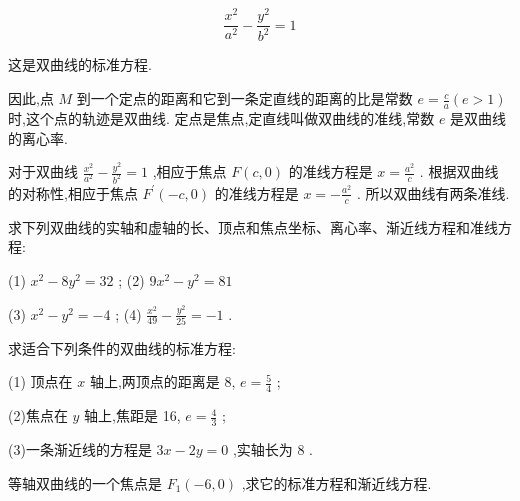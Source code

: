 \documentclass[lang=cn,newtx,10pt,scheme=chinese]{elegantbook}
\begin{document}
\[
  \frac{{x}^{2}}{{a}^{2}} - \frac{{y}^{2}}{{b}^{2}} = 1
\]

这是双曲线的标准方程.

因此,点 \(M\) 到一个定点的距离和它到一条定直线的距离的比是常数 \(e = \frac{c}{a}\left( {e > 1}\right)\) 时,这个点的轨迹是双曲线. 定点是焦点,定直线叫做双曲线的准线,常数 \(e\) 是双曲线的离心率.

对于双曲线 \(\frac{{x}^{2}}{{a}^{2}} - \frac{{y}^{2}}{{b}^{2}} = 1\) ,相应于焦点 \(F\left( {c,0}\right)\) 的准线方程是 \(x = \frac{{a}^{2}}{c}\) . 根据双曲线的对称性,相应于焦点 \({F}^{\prime }\left( {-c,0}\right)\) 的准线方程是 \(x = - \frac{{a}^{2}}{c}\) . 所以双曲线有两条准线.

\begin{problemset}[练习]

\item 求下列双曲线的实轴和虚轴的长、顶点和焦点坐标、离心率、渐近线方程和准线方程:

(1) \({x}^{2} - 8{y}^{2} = {32}\) ; (2) \(9{x}^{2} - {y}^{2} = {81}\)

(3) \({x}^{2} - {y}^{2} = - 4\) ; (4) \(\frac{{x}^{2}}{49} - \frac{{y}^{2}}{25} = - 1\) .

\item 求适合下列条件的双曲线的标准方程:

(1) 顶点在 \(x\) 轴上,两顶点的距离是 8, \(e = \frac{5}{4}\) ;

(2)焦点在 \(y\) 轴上,焦距是 16, \(e = \frac{4}{3}\) ;

(3)一条渐近线的方程是 \({3x} - {2y} = 0\) ,实轴长为 8 .

\item 等轴双曲线的一个焦点是 \({F}_{1}\left( {-6,0}\right)\) ,求它的标准方程和渐近线方程.

\end{problemset}
\end{document}
